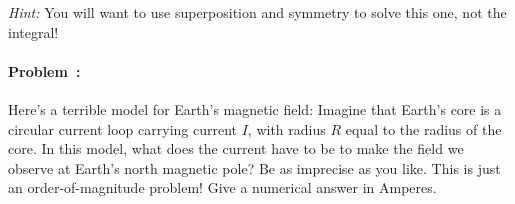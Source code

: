 \documentclass[12pt]{article}
\begin{document}
\textit{Hint:} You will want to use superposition and symmetry to
solve this one, not the integral!

\paragraph{Problem~\theproblem:}%
Here's a terrible model for Earth's magnetic field: Imagine that
Earth's core is a circular current loop carrying current $I$, with
radius $R$ equal to the radius of the core. In this model, what does
the current have to be to make the field we observe at Earth's
north magnetic pole? Be as imprecise as you like. This is just an
order-of-magnitude problem! Give a numerical answer in Amperes.
\end{document}
